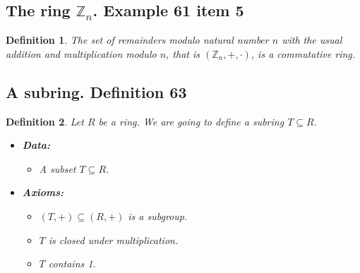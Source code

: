 \documentclass{article}
\newtheorem*{customdefinition}{Definition}
\begin{document}
\subsection*{The ring \( \mathbb{Z}_n \). Example 61 item 5}
\begin{customdefinition}
The set of remainders modulo natural number \( n \) with the usual addition and multiplication modulo \( n \), that is \( (\mathbb{Z}_n, +, \cdot) \), is a commutative ring.
\end{customdefinition}

\subsection*{A subring. Definition 63}
\begin{customdefinition}
Let \( R \) be a ring. We are going to define a subring \( T \subseteq R \).

\begin{itemize}
    \item \textbf{Data:} 
        \begin{itemize}
            \item A subset \( T \subseteq R \).
        \end{itemize}
    \item \textbf{Axioms:}
        \begin{itemize}
            \item \( (T, +) \subseteq (R, +) \) is a subgroup.
            \item \( T \) is closed under multiplication.
            \item \( T \) contains 1.
        \end{itemize}
\end{itemize}
\end{customdefinition}
\end{document}
